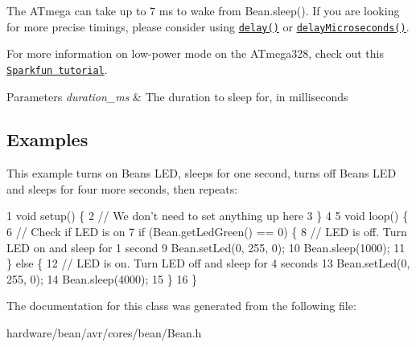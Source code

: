 The A\+Tmega can take up to 7 ms to wake from {\ttfamily Bean.\+sleep()}. If you are looking for more precise timings, please consider using \href{https://www.arduino.cc/en/Reference/Delay}{\tt delay()} or \href{https://www.arduino.cc/en/Reference/DelayMicroseconds}{\tt delay\+Microseconds()}.

For more information on low-\/power mode on the A\+Tmega328, check out this \href{https://www.sparkfun.com/tutorials/309}{\tt Sparkfun tutorial}.


\begin{DoxyParams}{Parameters}
{\em duration\+\_\+ms} & The duration to sleep for, in milliseconds\\
\hline
\end{DoxyParams}
\subsection*{Examples}

This example turns on Bean\textquotesingle{}s L\+E\+D, sleeps for one second, turns off Bean\textquotesingle{}s L\+E\+D and sleeps for four more seconds, then repeats\+:


\begin{DoxyCodeInclude}
1 void setup() \{
2   // We don't need to set anything up here
3 \}
4 
5 void loop() \{
6   // Check if LED is on
7   if (Bean.getLedGreen() == 0) \{
8     // LED is off. Turn LED on and sleep for 1 second
9     Bean.setLed(0, 255, 0);
10     Bean.sleep(1000);
11   \} else \{
12     // LED is on. Turn LED off and sleep for 4 seconds
13     Bean.setLed(0, 255, 0);
14     Bean.sleep(4000);
15   \}
16 \}
\end{DoxyCodeInclude}
 

The documentation for this class was generated from the following file\+:\begin{DoxyCompactItemize}
\item 
hardware/bean/avr/cores/bean/Bean.\+h\end{DoxyCompactItemize}
